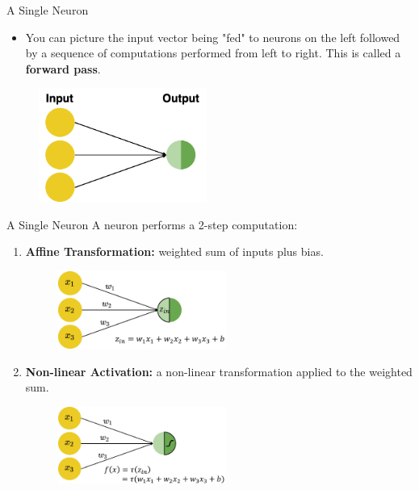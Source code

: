 \documentclass[11pt,compress,t,notes=noshow, xcolor=table]{beamer}
\begin{document}
\begin{vbframe} {A Single Neuron}
\begin{itemize}
\item %
You can picture the input vector being "fed" to neurons on the left followed by a sequence of computations performed from left to right. This is called a \textbf{forward pass}.
\end{itemize}
\vspace{1cm}
\begin{figure}
\includegraphics[width=5.5cm]{figure/forward_pass.png}
\end{figure}
\end{vbframe}

\begin{frame} {A Single Neuron}
A neuron performs a 2-step computation:
\begin{enumerate}
\item \textbf{Affine Transformation:} weighted sum of inputs plus bias.
\begin{figure}
\includegraphics[width=5.5cm]{figure/step1-zin.jpg}
\end{figure}
\item \textbf{Non-linear Activation:} a non-linear transformation applied to the weighted sum.
\begin{figure}
\includegraphics[width=5.5cm]{figure/step2-zin.jpg}
\end{figure}
\end{enumerate}
\end{frame}
\end{document}
